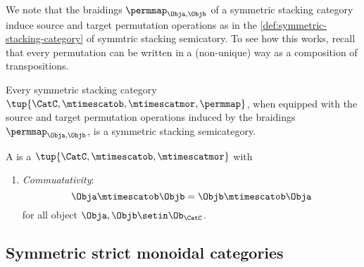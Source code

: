 {\begin{ctdefinition}
    \end{ctdefinition}

    We note that the braidings $\permmap_{\Obja, \Objb}$ of a symmetric stacking category induce source and target permutation operations as in the \cref{def:symmetric-stacking-category} of symmtric stacking semicatory.
    To see how this works, recall that every permutation can be written in a (non-unique) way as a composition of transpositions.

    \begin{lemma}
        Every symmetric stacking category $\tup{\CatC, \mtimescatob, \mtimescatmor, \permmap}$, when equipped with the source and target permutation operations induced by the braidings $\permmap_{\Obja, \Objb}$, is a symmetric stacking semicategory.
    \end{lemma}



    \begin{ctdefinition}
        \label{def:commutative-stacking-cat}
        A  is a  $\tup{\CatC, \mtimescatob, \mtimescatmor}$ with

        \condit

        \begin{enumerate}
            \item \emph{Commuatativity}:
                  \begin{equation}
                      \Obja \mtimescatob \Objb = \Objb \mtimescatob \Obja
                  \end{equation}
                  for all object $\Obja, \Objb \setin \Ob_\CatC$.
        \end{enumerate}
    \end{ctdefinition}



    \subsection{Symmetric strict monoidal categories}

}
